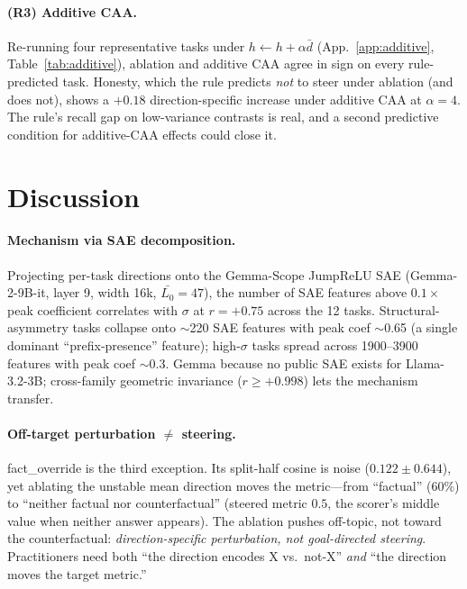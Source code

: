 \documentclass{article}
\begin{document}
\paragraph{(R3) Additive CAA.}
Re-running four representative tasks under
$h \leftarrow h + \alpha \bar d$ (App.~\ref{app:additive},
Table~\ref{tab:additive}), ablation and additive CAA agree in sign
on every rule-predicted task. Honesty, which the rule predicts
\emph{not} to steer under ablation (and does not), shows a
$+0.18$ direction-specific increase under additive CAA at $\alpha=4$.
The rule's recall gap on low-variance contrasts is real, and a
second predictive condition for additive-CAA effects could close it.

\section{Discussion}
\label{sec:discussion}

\paragraph{Mechanism via SAE decomposition.}
Projecting per-task directions onto the Gemma-Scope JumpReLU SAE
(Gemma-2-9B-it, layer 9, width 16k, $\bar{L_0}{=}47$), the number
of SAE features above $0.1 \times$ peak coefficient correlates with
$\sigma$ at $r = +0.75$ across the 12 tasks. Structural-asymmetry
tasks collapse onto $\sim$220 SAE features with peak coef $\sim$0.65
(a single dominant ``prefix-presence'' feature); high-$\sigma$ tasks
spread across 1900--3900 features with peak coef $\sim$0.3. Gemma
because no public SAE exists for Llama-3.2-3B; cross-family
geometric invariance ($r \geq +0.998$) lets the mechanism transfer.

\paragraph{Off-target perturbation $\neq$ steering.}
fact\_override is the third exception. Its split-half cosine is
noise ($0.122 \pm 0.644$), yet ablating the unstable mean direction
moves the metric---from ``factual'' (60\%) to ``neither factual nor
counterfactual'' (steered metric $0.5$, the scorer's middle value
when neither answer appears). The ablation pushes off-topic, not
toward the counterfactual: \emph{direction-specific perturbation,
not goal-directed steering}. Practitioners need both ``the
direction encodes X vs.~not-X'' \emph{and} ``the direction moves
the target metric.''
\end{document}
